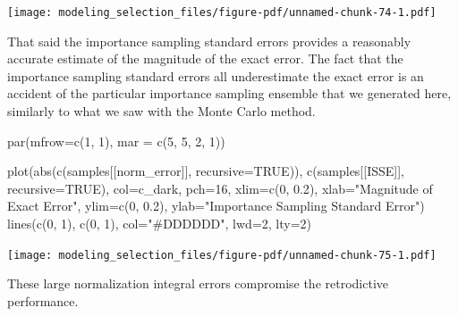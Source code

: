 \documentclass[
  letterpaper,
  DIV=11,
  numbers=noendperiod]{scrartcl}
\newenvironment{Shaded}{\begin{snugshade}}{\end{snugshade}}
\newcommand{\AttributeTok}[1]{\textcolor[rgb]{0.40,0.45,0.13}{#1}}
\newcommand{\ConstantTok}[1]{\textcolor[rgb]{0.56,0.35,0.01}{#1}}
\newcommand{\DecValTok}[1]{\textcolor[rgb]{0.68,0.00,0.00}{#1}}
\newcommand{\FloatTok}[1]{\textcolor[rgb]{0.68,0.00,0.00}{#1}}
\newcommand{\FunctionTok}[1]{\textcolor[rgb]{0.28,0.35,0.67}{#1}}
\newcommand{\NormalTok}[1]{\textcolor[rgb]{0.00,0.23,0.31}{#1}}
\newcommand{\StringTok}[1]{\textcolor[rgb]{0.13,0.47,0.30}{#1}}
\begin{document}
\texttt{[image: modeling\_selection\_files/figure-pdf/unnamed-chunk-74-1.pdf]}

That said the importance sampling standard errors provides a reasonably
accurate estimate of the magnitude of the exact error. The fact that the
importance sampling standard errors all underestimate the exact error is
an accident of the particular importance sampling ensemble that we
generated here, similarly to what we saw with the Monte Carlo method.

\begin{Shaded}
\begin{Highlighting}[]
\FunctionTok{par}\NormalTok{(}\AttributeTok{mfrow=}\FunctionTok{c}\NormalTok{(}\DecValTok{1}\NormalTok{, }\DecValTok{1}\NormalTok{), }\AttributeTok{mar =} \FunctionTok{c}\NormalTok{(}\DecValTok{5}\NormalTok{, }\DecValTok{5}\NormalTok{, }\DecValTok{2}\NormalTok{, }\DecValTok{1}\NormalTok{))}

\FunctionTok{plot}\NormalTok{(}\FunctionTok{abs}\NormalTok{(}\FunctionTok{c}\NormalTok{(samples[[}\StringTok{\textquotesingle{}norm\_error\textquotesingle{}}\NormalTok{]], }\AttributeTok{recursive=}\ConstantTok{TRUE}\NormalTok{)),}
         \FunctionTok{c}\NormalTok{(samples[[}\StringTok{\textquotesingle{}ISSE\textquotesingle{}}\NormalTok{]], }\AttributeTok{recursive=}\ConstantTok{TRUE}\NormalTok{),}
     \AttributeTok{col=}\NormalTok{c\_dark, }\AttributeTok{pch=}\DecValTok{16}\NormalTok{,}
     \AttributeTok{xlim=}\FunctionTok{c}\NormalTok{(}\DecValTok{0}\NormalTok{, }\FloatTok{0.2}\NormalTok{), }\AttributeTok{xlab=}\StringTok{"Magnitude of Exact Error"}\NormalTok{,}
     \AttributeTok{ylim=}\FunctionTok{c}\NormalTok{(}\DecValTok{0}\NormalTok{, }\FloatTok{0.2}\NormalTok{), }\AttributeTok{ylab=}\StringTok{"Importance Sampling Standard Error"}\NormalTok{)}
\FunctionTok{lines}\NormalTok{(}\FunctionTok{c}\NormalTok{(}\DecValTok{0}\NormalTok{, }\DecValTok{1}\NormalTok{), }\FunctionTok{c}\NormalTok{(}\DecValTok{0}\NormalTok{, }\DecValTok{1}\NormalTok{), }\AttributeTok{col=}\StringTok{"\#DDDDDD"}\NormalTok{, }\AttributeTok{lwd=}\DecValTok{2}\NormalTok{, }\AttributeTok{lty=}\DecValTok{2}\NormalTok{)}
\end{Highlighting}
\end{Shaded}

\texttt{[image: modeling\_selection\_files/figure-pdf/unnamed-chunk-75-1.pdf]}

These large normalization integral errors compromise the retrodictive
performance.
\end{document}

